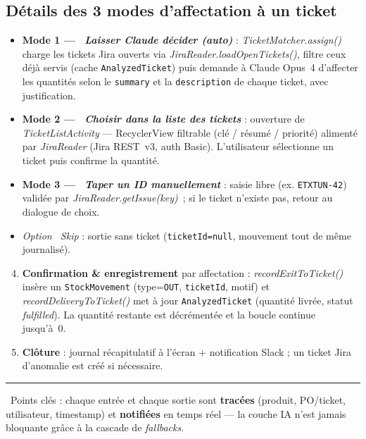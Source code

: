 \documentclass[11pt,a4paper]{article}
\begin{document}
\subsection{Détails des 3 modes d'affectation à un ticket}
\begin{itemize}
  \item \textbf{Mode 1 — \faBrain\ \emph{Laisser Claude décider (auto)}} :
        \emph{TicketMatcher.assign()} charge les tickets Jira ouverts via
        \emph{JiraReader.loadOpenTickets()}, filtre ceux déjà servis
        (cache \texttt{AnalyzedTicket}) puis demande à Claude Opus~4
        d'affecter les quantités selon le \texttt{summary} et la
        \texttt{description} de chaque ticket, avec justification.
  \item \textbf{Mode 2 — \faList\ \emph{Choisir dans la liste des tickets}} :
        ouverture de \emph{TicketListActivity} — RecyclerView filtrable
        (clé / résumé / priorité) alimenté par \emph{JiraReader}
        (Jira REST~v3, auth Basic). L'utilisateur sélectionne un ticket
        puis confirme la quantité.
  \item \textbf{Mode 3 — \faPencilAlt\ \emph{Taper un ID manuellement}} :
        saisie libre (ex. \texttt{ETXTUN-42}) validée par
        \emph{JiraReader.getIssue(key)}~; si le ticket n'existe pas,
        retour au dialogue de choix.
  \item \textit{Option \faForward\ Skip} : sortie sans ticket
        (\texttt{ticketId=null}, mouvement tout de même journalisé).
\end{itemize}

\begin{enumerate}\setcounter{enumi}{3}
  \item \textbf{Confirmation \& enregistrement} par affectation :
        \emph{recordExitToTicket()} insère un \texttt{StockMovement}
        (type=\texttt{OUT}, \texttt{ticketId}, motif) et
        \emph{recordDeliveryToTicket()} met à jour
        \texttt{AnalyzedTicket} (quantité livrée, statut
        \emph{fulfilled}). La quantité restante est décrémentée et la
        boucle continue jusqu'à~0.
  \item \textbf{Clôture} : journal récapitulatif à l'écran + notification
        Slack ; un ticket Jira d'anomalie est créé si nécessaire.
\end{enumerate}

\vspace{2pt}\hrule\vspace{2pt}
\begin{center}\footnotesize
  \faLightbulb\ Points clés : chaque entrée et chaque sortie sont
  \textbf{tracées} (produit, PO/ticket, utilisateur, timestamp) et
  \textbf{notifiées} en temps réel — la couche IA n'est jamais
  bloquante grâce à la cascade de \emph{fallbacks}.
\end{center}
\end{document}
